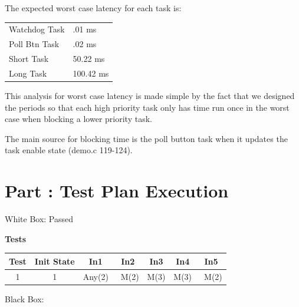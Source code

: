 \documentclass{article}
\newcounter{partNum}
\newcommand{\partNum}{%
        \stepcounter{partNum}%
        \thepartNum}
\newcommand{\sectPart}[1]{\section*{Part \partNum: #1}}
\begin{document}
\vspace{1em}

The expected worst case latency for each task is:

\vspace{1em}

\begin{tabular}{l | l}
Watchdog Task & .01 ms \\
Poll Btn Task & .02 ms \\
Short Task & 50.22 ms \\
Long Task & 100.42 ms \\ 
\end{tabular}

\vspace{1em}

This analysis for worst case latency is made simple by the fact that we designed the periods so that each high priority task only has time run once in the worst case when blocking a lower priority task.

The main source for blocking time is the poll button task when it updates the task enable state (demo.c 119-124).


\newpage

\sectPart{Test Plan Execution}

White Box: Passed

\begin{center}
    \textbf{Tests}\\
    \vspace{0.5em}
    \begin{tabular}{| c | c | c | c | c | c | c |}
        \hline
        Test & Init State & In1 & In2 & In3 & In4 & In5 \\ \hline
        1 & 1 & Any(2) & ~M(2) & M(3) & M(3) & ~M(2) \\ \hline
    \end{tabular}
\end{center}

Black Box: 
\end{document}

